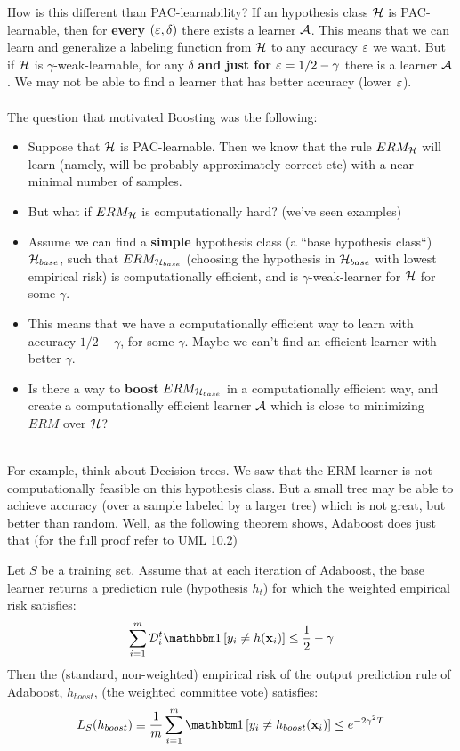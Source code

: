 How is this different than PAC-learnability? If an hypothesis class $\mathcal{H}$  is PAC-learnable, then for \textbf{every} $(\varepsilon,\delta)$ there exists a learner $\mathcal{A}$. This means that we can learn and generalize a labeling function from $\mathcal{H}$ to any accuracy $\varepsilon$ we want. But if $\mathcal{H}$ is $\gamma$-weak-learnable, for any $\delta$ \textbf{and just for $\varepsilon=1/2-\gamma$} there is a learner $\mathcal{A}$. We may not be able to find a learner that has better accuracy (lower $\varepsilon$). 
\\~\\
The question that motivated Boosting was the following: 
\begin{itemize}
	\item Suppose that $\mathcal{H}$ is PAC-learnable. Then we know that the rule $ERM_{\mathcal{H}}$ will learn (namely, will be probably approximately correct etc) with a near-minimal number of samples.
	\item But what if $ERM_{\mathcal{H}}$ is computationally hard? (we've seen examples)
	\item Assume we can find a \textbf{simple} hypothesis class (a ``base hypothesis class``) $\mathcal{H}_{base}$, such that $ERM_{\mathcal{H}_{base}}$ (choosing the hypothesis in $\mathcal{H}_{base}$ with lowest empirical risk) is computationally efficient, and is $\gamma$-weak-learner for $\mathcal{H}$ for some $\gamma$.
	\item This means that we have a computationally efficient way to learn with accuracy $1/2-\gamma$, for some $\gamma$. Maybe we can't find an efficient learner with better $\gamma$.
	\item Is there a way to \textbf{boost} $ERM_{\mathcal{H}_{base}}$ in a computationally efficient way, and create a computationally efficient learner $\mathcal{A}$ which is close to minimizing $ERM$ over $\mathcal{H}$?
\end{itemize}~\\
For example, think about Decision trees. We saw that the ERM learner is not computationally feasible on this hypothesis class. But a small tree may be able to achieve accuracy (over a sample labeled by a larger tree) which is not great, but better than random. Well, as the following theorem shows, Adaboost does just that (for the full proof refer to UML 10.2)
\begin{theorem}
Let $S$ be a training set. Assume that at each iteration of Adaboost, the base learner returns a prediction rule (hypothesis $h_t$) for which the weighted empirical risk satisfies:
$$ \sum_{i=1}^m \Dc^{t}_i\indc{y_i \neq h(\x_i)} \leq \frac{1}{2}-\gamma $$
Then the (standard, non-weighted) empirical risk of the output prediction rule of Adaboost, $h_{boost}$, (the weighted committee vote) satisfies:
$$ L_S(h_{boost}) \equiv \frac{1}{m}\sum_{i=1}^m \indc{y_i \neq h_{boost}(\x_i)} \leq e^{-2\gamma^2 T }$$
\end{theorem}

